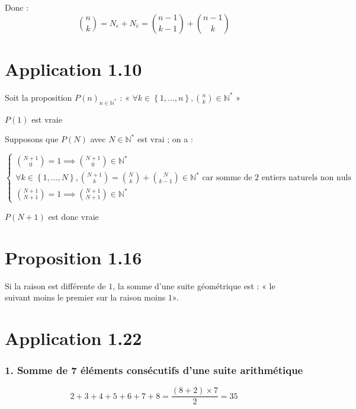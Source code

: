 \documentclass{report}
\begin{document}
Donc :
\begin{displaymath}
\binom{n}{k}= N_e + N_{\bar{e}} =  \binom{n-1}{k-1}+ \binom{n-1}{k}
\end{displaymath}


\section*{Application 1.10}

Soit la proposition $P(n)_{n \in \mathbb{N}^*}$ : « $\forall  k \in \left\lbrace 1,\ldots, n\right\rbrace, \binom{n}{k} \in \mathbb{N}^*$ »

$P(1)$ est vraie

Supposons que  $P(N)$ avec $N \in \mathbb{N}^*$ est vrai ; on a :

\begin{equation*}
	\begin{cases}
		\binom{N+1}{0} = 1 \implies \binom{N+1}{0} \in \mathbb{N}^* \\
		\forall k \in \left\lbrace 1, ... , N\right\rbrace , \binom{N+1}{k} = \binom{N}{k} + \binom{N}{k-1} \in \mathbb{N}^* \text{ car somme de 2 entiers naturels non nuls}\\
		\binom{N+1}{N+1} = 1  \implies \binom{N+1}{N+1} \in \mathbb{N}^*
	\end{cases}
\end{equation*}

$P(N+1)$ est donc vraie


\section*{Proposition 1.16}

Si la raison est différente de $1$, la somme d'une suite géométrique est : « le suivant moins le premier sur la raison moins $1$».

\section*{Application 1.22}

\subsubsection*{1. Somme de 7 éléments consécutifs d'une suite arithmétique}
\begin{displaymath}
	2 + 3 + 4 + 5 + 6 + 7 + 8 = \frac{(8+2)\times 7}{2} = 35
\end{displaymath}
\end{document}

